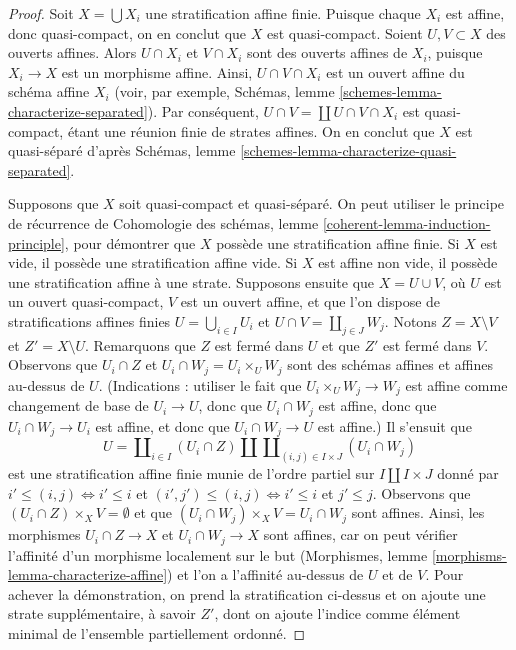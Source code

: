 \begin{proof}
Soit $X = \bigcup X_i$ une stratification affine finie. Puisque chaque $X_i$
est affine, donc quasi-compact, on en conclut que $X$ est quasi-compact.
Soient $U, V \subset X$ des ouverts affines. Alors $U \cap X_i$ et $V \cap X_i$
sont des ouverts affines de $X_i$, puisque $X_i \to X$ est un morphisme affine. Ainsi,
$U \cap V \cap X_i$ est un ouvert affine du schéma affine $X_i$ (voir, par exemple,
Schémas, lemme \ref{schemes-lemma-characterize-separated}).
Par conséquent, $U \cap V = \coprod U \cap V \cap X_i$ est quasi-compact,
étant une réunion finie de strates affines. On en conclut que $X$ est
quasi-séparé d'après Schémas, lemme
\ref{schemes-lemma-characterize-quasi-separated}.

\medskip\noindent
Supposons que $X$ soit quasi-compact et quasi-séparé. On peut utiliser le
principe de récurrence de
Cohomologie des schémas, lemme \ref{coherent-lemma-induction-principle},
pour démontrer que $X$ possède une stratification affine finie.
Si $X$ est vide, il possède une stratification affine vide.
Si $X$ est affine non vide, il possède une stratification affine
à une strate. Supposons ensuite que $X = U \cup V$, où $U$ est un ouvert quasi-compact,
$V$ est un ouvert affine, et que l'on dispose de stratifications affines finies
$U = \bigcup_{i \in I} U_i$ et $U \cap V = \coprod_{j \in J} W_j$.
Notons $Z = X \setminus V$ et $Z' = X \setminus U$.
Remarquons que $Z$ est fermé dans $U$ et que $Z'$ est fermé dans $V$.
Observons que $U_i \cap Z$ et $U_i \cap W_j = U_i \times_U W_j$ sont des schémas
affines et affines au-dessus de $U$. (Indications : utiliser le fait que $U_i \times_U W_j \to W_j$ est
affine comme changement de base de $U_i \to U$, donc que $U_i \cap W_j$ est affine,
donc que $U_i \cap W_j \to U_i$ est affine, et donc que $U_i \cap W_j \to U$ est affine.)
Il s'ensuit que
$$
U = \coprod\nolimits_{i \in I} (U_i \cap Z) \amalg
\coprod\nolimits_{(i, j) \in I \times J} (U_i \cap W_j)
$$
est une stratification affine finie munie de l'ordre partiel sur
$I \amalg I \times J$ donné par $i' \leq (i, j) \Leftrightarrow i' \leq i$
et $(i', j') \leq (i, j) \Leftrightarrow i' \leq i$ et $j' \leq j$.
Observons que $(U_i \cap Z) \times_X V = \emptyset$ et que
$(U_i \cap W_j) \times_X V = U_i \cap W_j$ sont affines.
Ainsi, les morphismes $U_i \cap Z \to X$ et $U_i \cap W_j \to X$
sont affines, car on peut vérifier l'affinité d'un morphisme
localement sur le but
(Morphismes, lemme \ref{morphisms-lemma-characterize-affine})
et l'on a l'affinité au-dessus de $U$ et de $V$.
Pour achever la démonstration, on prend la stratification ci-dessus
et on ajoute une strate supplémentaire, à savoir $Z'$,
dont on ajoute l'indice comme élément minimal de l'ensemble partiellement ordonné.
\end{proof}

